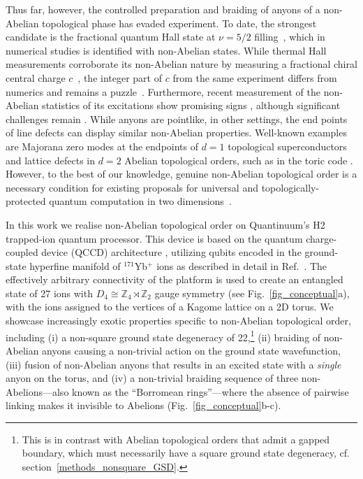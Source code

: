 \documentclass[nofootinbib,pra,twocolumn,showpacs,superscriptaddress,notitlepage,amsmath]{revtex4-2} %
\begin{document}
Thus far, however, the controlled preparation and braiding of anyons of a non-Abelian topological phase has evaded experiment. To date, the strongest candidate is the fractional quantum Hall state at $\nu = 5/2$ filling~\cite{pan_exact_1999}, which in numerical studies is identified with non-Abelian states.
While thermal Hall measurements corroborate its non-Abelian nature by measuring a fractional chiral central charge $c$~\cite{banerjee_observation_2018}, the integer part of $c$ from the same experiment differs from numerics and remains a puzzle~\cite{ma_fractional_2022}. Furthermore, recent measurement of the non-Abelian statistics of its excitations show promising signs \cite{willett_interference_2023}, although significant challenges remain \cite{feldman_fractional_2021}. While anyons are pointlike, in other settings, the end points of line defects can display similar non-Abelian properties. Well-known examples are Majorana zero modes at the endpoints of $d=1$ topological superconductors~\cite{kitaev_unpaired_2001, aghaee_inas-hybrid_2022} and lattice defects in $d=2$ Abelian topological orders, such as in the toric code \cite{bombin_topological_2010, andersen_observation_2022, xu_digital_2022}. However, to the best of our knowledge, genuine non-Abelian topological order is a necessary condition for existing proposals for universal and topologically-protected quantum computation in two dimensions~\cite{kitaev_fault-tolerant_2003, cui_universal_2015, barkeshli_physical_2015, barkeshli_theory_2013, barkeshli_genons_2013, cong_universal_2017}.

In this work we realise non-Abelian topological order on Quantinuum's H2 trapped-ion quantum processor. This device is based on the quantum charge-coupled device (QCCD) architecture \cite{wineland_1998,kielpinski_2002}, utilizing qubits encoded in the ground-state hyperfine manifold of $^{171}$Yb$^{+}$ ions as described in detail in Ref.~. The effectively arbitrary connectivity of the platform is used to create an entangled state of 27 ions with $D_4 \cong \mathbb Z_4 \rtimes \mathbb Z_2$ gauge symmetry (see Fig.~\ref{fig_conceptual}a), with the ions assigned to the vertices of a Kagome lattice on a 2D torus. We showcase increasingly exotic properties specific to non-Abelian topological order, including (i) a non-square ground state degeneracy of 22,\footnote{This is in contrast with Abelian topological orders that admit a gapped boundary, which must necessarily have a square ground state degeneracy, cf. section~\ref{methods_nonsquare_GSD}.} (ii) braiding of non-Abelian anyons causing a non-trivial action on the ground state wavefunction, (iii) fusion of non-Abelian anyons that results in an excited state with a \textit{single} anyon on the torus, and (iv) a non-trivial braiding sequence of three non-Abelions---also known as the ``Borromean rings''---where the absence of pairwise linking makes it invisible to Abelions (Fig.~\ref{fig_conceptual}b-c).
\end{document}
